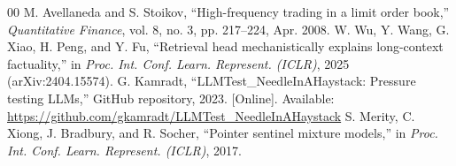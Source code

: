 \documentclass[conference]{IEEEtran}
\begin{document}
\begin{thebibliography}{00}
 M. Avellaneda and S. Stoikov, ``High-frequency trading in a limit order book,'' \textit{Quantitative Finance}, vol. 8, no. 3, pp. 217--224, Apr. 2008.
 W. Wu, Y. Wang, G. Xiao, H. Peng, and Y. Fu, ``Retrieval head mechanistically explains long-context factuality,'' in \textit{Proc. Int. Conf. Learn. Represent. (ICLR)}, 2025 (arXiv:2404.15574).
 G. Kamradt, ``LLMTest\_NeedleInAHaystack: Pressure testing LLMs,'' GitHub repository, 2023. [Online]. Available: \url{https://github.com/gkamradt/LLMTest_NeedleInAHaystack}
 S. Merity, C. Xiong, J. Bradbury, and R. Socher, ``Pointer sentinel mixture models,'' in \textit{Proc. Int. Conf. Learn. Represent. (ICLR)}, 2017.
\end{thebibliography}
\end{document}
